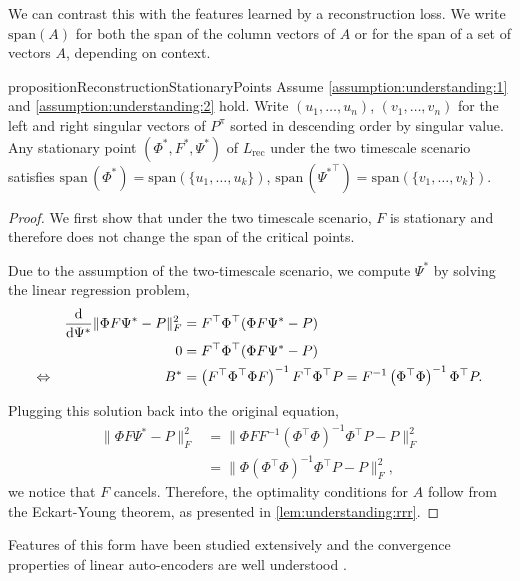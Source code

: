 We can contrast this with the features learned by a reconstruction loss.
We write $\mathrm{span}(A)$ for both the span of the column vectors of $A$ or for the span of a set of vectors $A$, depending on context.
\begin{restatable}{proposition}{ReconstructionStationaryPoints}\label{prop:understanding:2}
Assume \autoref{assumption:understanding:1} and \autoref{assumption:understanding:2} hold. Write $(u_1,\dots,u_n)$, $(v_1,\dots,v_n)$ for the left and right singular vectors of $P^\pi$ sorted in descending order by singular value. Any stationary point $(\Phi^*, F^*, \Psi^*)$ of $L_\text{rec}$ under the two timescale scenario satisfies $\mathrm{span}\,(\Phi^*)=\mathrm{span}\left(\{u_1,\dots,u_k\}\right)$, $\mathrm{span}\,({\Psi^*}^\top)=\mathrm{span}\left(\{v_1,\dots,v_k\}\right)$.
\end{restatable}
\begin{proof}
We first show that under the two timescale scenario, $F$ is stationary and therefore does not change the span of the critical points.

Due to the assumption of the two-timescale scenario, we compute $\Psi^*$ by solving the linear regression problem,
\begin{align}
    &&\frac{\mathrm{d}}{\mathrm{d} \Psi^*} \lVert \Phi F\Psi^* - P \rVert_F^2 &= F^\top {\Phi}^\top ({\Phi}F\Psi^* - P)\\
    &&0 &=  F^\top {\Phi}^\top ({\Phi}F\Psi^* - P)\\
    \Leftrightarrow && B^* &= \left(F^\top {\Phi}^\top {\Phi}F\right)^{-1} F^\top \Phi^\top P = F^{-1}\left(\Phi^\top \Phi\right)^{-1} \Phi^\top P.
\end{align}

Plugging this solution back into the original equation, 
\begin{align}
    \lVert \Phi F\Psi^* - P \rVert_F^2 &= \lVert \Phi FF^{-1}\left(\Phi^\top \Phi\right)^{-1} \Phi^\top P - P \rVert_F^2\\
    &= \lVert \Phi \left(\Phi^\top \Phi\right)^{-1} \Phi^\top P - P \rVert_F^2,
\end{align}
we notice that $F$ cancels.
Therefore, the optimality conditions for $A$ follow from the Eckart-Young theorem, as presented in \autoref{lem:understanding:rrr}.
\end{proof}


Features of this form have been studied extensively and the convergence properties of linear auto-encoders are well understood \parencite{baldi1989neural,pretorius2018learning,bao2020regularized}.

